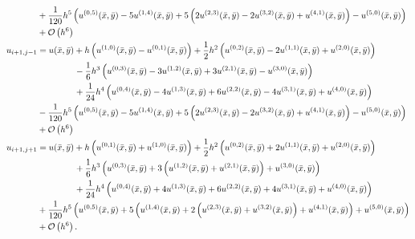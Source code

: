 \documentclass[12pt]{article}
\newcommand{\xbar}{\bar{x}}
\newcommand{\ybar}{\bar{y}}
\newcommand{\bO}{\mathcal{O}}
\begin{document}
\begin{subequations}
\begin{align}
		&+\frac{1}{
			120} h^5 \left(u^{(0,5)}(\xbar,\ybar)-5
		u^{(1,4)}(\xbar,\ybar)+5 \left(2 u^{(2,3)}(\xbar,\ybar)-2
		u^{(3,2)}(\xbar,\ybar)+u^{(4,1)}(\xbar,\ybar)\right)-u^{(5,0)}
		(\xbar,\ybar)\right)\nonumber\\
		&+\bO\left(h^6\right)\\
		u_{i+1,j-1} &= u(\xbar,\ybar)
		+h\left(u^{(1,0)}(\xbar,\ybar)-u^{(0,1)}(\xbar,\ybar)\right)
		+\frac{1}{2} h^2 \left(u^{(0,2)}(\xbar,\ybar)-2		u^{(1,1)}(\xbar,\ybar)+u^{(2,0)}(\xbar,\ybar)\right)\nonumber\\
		&\hspace{1.5cm}-\frac{1}{6} h^3 \left(u^{(0,3)}(\xbar,\ybar)-3 u^{(1,2)}(\xbar,\ybar)+3u^{(2,1)}(\xbar,\ybar)-u^{(3,0)}(\xbar,\ybar)\right)\nonumber\\
		&\hspace{1.5cm}+\frac{1}{24} h^4 \left(u^{(0,4)}(\xbar,\ybar)-4 u^{(1,3)}(\xbar,\ybar)+6u^{(2,2)}(\xbar,\ybar)-4 u^{(3,1)}(\xbar,\ybar)+u^{(4,0)}(\xbar,\ybar)\right)\nonumber\\
		&-\frac{1}{120} h^5 \left(u^{(0,5)}(\xbar,\ybar)-5
		u^{(1,4)}(\xbar,\ybar)+5 \left(2 u^{(2,3)}(\xbar,\ybar)-2
		u^{(3,2)}(\xbar,\ybar)+u^{(4,1)}(\xbar,\ybar)\right)-u^{(5,0)}(\xbar,\ybar)\right)\nonumber\\
		&+\bO\left(h^6\right)\\
		u_{i+1,j+1} &= u(\xbar,\ybar)
		+h\left(u^{(0,1)}(\xbar,\ybar)+u^{(1,0)}(\xbar,\ybar)\right)
		+\frac{1}{2} h^2 \left(u^{(0,2)}(\xbar,\ybar)+2
		u^{(1,1)}(\xbar,\ybar)+u^{(2,0)}(\xbar,\ybar)\right)\nonumber\\
		&\hspace{1.5cm}+\frac{1}{6} h^3 \left(u^{(0,3)}(\xbar,\ybar)+3		\left(u^{(1,2)}(\xbar,\ybar)+u^{(2,1)}(\xbar,\ybar)\right)+u^{(3,0)}(\xbar,\ybar)\right)\nonumber\\
		&\hspace{1.5cm}+\frac{1}{24} h^4 \left(u^{(0,4)}(\xbar,\ybar)+4 u^{(1,3)}(\xbar,\ybar)+6 u^{(2,2)}(\xbar,\ybar)+4
		u^{(3,1)}(\xbar,\ybar)+u^{(4,0)}(\xbar,\ybar)\right)\nonumber\\
		&+\frac{1}{120} h^5 \left(u^{(0,5)}(\xbar,\ybar)+5
		\left(u^{(1,4)}(\xbar,\ybar)+2
		\left(u^{(2,3)}(\xbar,\ybar)+u^{(3,2)}(\xbar,\ybar)\right)+u^{(4,1)}(\xbar,\ybar)\right)+u^{(5,0)}(\xbar
		,\ybar)\right)\nonumber\\
		&+\bO\left(h^6\right).
	\end{align}
\end{subequations}
\end{document}
